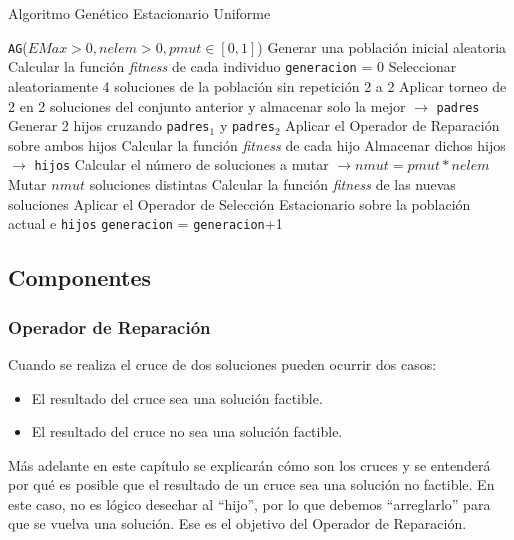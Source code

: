 \begin{algorithm}
\caption{Algoritmo Genético Estacionario Uniforme}\label{alg:AGEU}
\begin{algorithmic}[1]
\Procedure \texttt{AG}($EMax > 0, nelem > 0, pmut \in [0,1]$)
\State Generar una población inicial aleatoria
\State Calcular la función \textit{fitness} de cada individuo
\State \texttt{generacion} = 0
	\State Seleccionar aleatoriamente 4 soluciones de la población sin repetición 2 a 2
	\State Aplicar torneo de 2 en 2 soluciones del conjunto anterior y almacenar solo la mejor $\xrightarrow{}{}$ \texttt{padres}
	\State Generar 2 hijos cruzando \texttt{padres$_1$} y \texttt{padres$_2$}
	\State Aplicar el Operador de Reparación sobre ambos hijos
	\State Calcular la función \textit{fitness} de cada hijo
	\State Almacenar dichos hijos $\xrightarrow{}{}$ \texttt{hijos}
	\State Calcular el número de soluciones a mutar $\xrightarrow{}{} nmut = pmut*nelem$
	\State Mutar $nmut$ soluciones distintas
	\State Calcular la función \textit{fitness} de las nuevas soluciones
	\State Aplicar el Operador de Selección Estacionario sobre la población actual e \texttt{hijos}
	\State \texttt{generacion} = \texttt{generacion}+1
\EndWhile
\EndProcedure
\end{algorithmic}
\end{algorithm}

\subsection{Componentes}

\subsubsection{Operador de Reparación}

Cuando se realiza el cruce de dos soluciones pueden ocurrir dos casos:
\begin{itemize}
	\item El resultado del cruce sea una solución factible.
	\item El resultado del cruce no sea una solución factible.
\end{itemize}

Más adelante en este capítulo se explicarán cómo son los cruces y se entenderá por qué es posible que el resultado de un cruce sea una solución no factible. 
En este caso, no es lógico desechar al ``hijo'', por lo que debemos ``arreglarlo'' para que se vuelva una solución. 
Ese es el objetivo del Operador de Reparación. 

